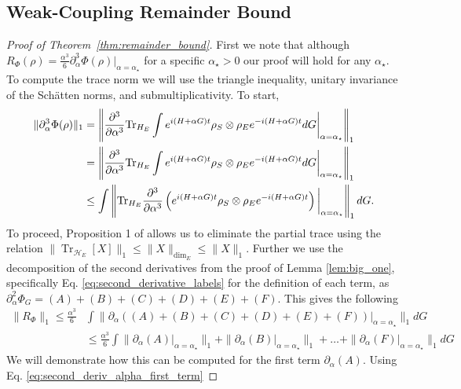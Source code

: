 \documentclass{article}
\newcommand{\brackets}[1]{\left[ #1 \right]}
\newcommand{\norm}[1]{\| #1 \|}
\DeclareMathOperator{\Tr}{Tr}
\newcommand{\partrace}[2]{\Tr_{#1} \brackets{ #2 }}
\newcommand{\hilb}{\mathcal{H}}
\begin{document}
\subsection{Weak-Coupling Remainder Bound} \label{sec:weak_coupling_remainder_bound}

\begin{proof}[Proof of Theorem~\ref{thm:remainder_bound}]
First we note that although $R_{\Phi}(\rho) = \frac{\alpha^3}{6} \partial_{\alpha}^3 \Phi(\rho)\big|_{\alpha = \alpha_{\star}}$ for a specific $ \alpha_{\star} > 0$ our proof will hold for any $\alpha_{\star}$. To compute the trace norm we will use the triangle inequality, unitary invariance of the Sch\"{a}tten norms, and submultiplicativity. To start,
\begin{align}
    \|\partial_\alpha^3 \Phi(\rho) \|_1 &= \left\| \frac{\partial^3}{\partial \alpha^3} {\rm Tr}_{H_E} \int e^{i(H+\alpha G)t} \rho_S \otimes \rho_E e^{-i(H+\alpha G)t} dG \bigg|_{\alpha = \alpha_{\star}} \right\|_1 \nonumber\\
    &= \left\| \frac{\partial^3}{\partial \alpha^3} {\rm Tr}_{H_E} \int e^{i(H+\alpha G)t} \rho_S \otimes \rho_E e^{-i(H+\alpha G)t} dG \bigg|_{\alpha = \alpha_{\star}} \right\|_1 \nonumber\\
    &\le    \int \left\|{\rm Tr}_{H_E}\frac{\partial^3}{\partial \alpha^3}\left( e^{i(H+\alpha G)t} \rho_S \otimes \rho_E e^{-i(H+\alpha G)t}\right) \bigg|_{\alpha = \alpha_{\star}} \right\|_1 dG.\label{eq:3derivBd}
\end{align}
To proceed, Proposition 1 of \cite{rastegin2012relations} allows us to eliminate the partial trace using the relation
$\norm{\partrace{\hilb_E}{X}}_{1} \le \norm{X}_{\dim_E} \le \norm{X}_1$. Further we use the decomposition of the second derivatives from the proof of Lemma \ref{lem:big_one}, specifically  Eq. \eqref{eq:second_derivative_labels} for the definition of each term, as $\partial_{\alpha}^2 \Phi_G = (A) + (B) + (C) + (D) +(E) + (F)$. This gives the following 
\begin{align}
    \norm{R_{\Phi}}_1 \le \frac{\alpha^3}{6} &\int \norm{\partial_{\alpha}((A) + (B) + (C) + (D) +(E) + (F)) \big|_{\alpha = \alpha_{\star}} }_1 dG \\
    &\le \frac{\alpha^3}{6} \int \norm{\partial_{\alpha}(A)\big|_{\alpha = \alpha_{\star}} }_1 + \norm{\partial_{\alpha}(B) \big|_{\alpha = \alpha_{\star}} }_1 + \ldots + \norm{\partial_{\alpha}(F) \big|_{\alpha = \alpha_{\star}} }_1 dG
\end{align}
We will demonstrate how this can be computed for the first term $\partial_{\alpha}(A)$. Using Eq. \ref{eq:second_deriv_alpha_first_term}

\end{proof}
\end{document}
